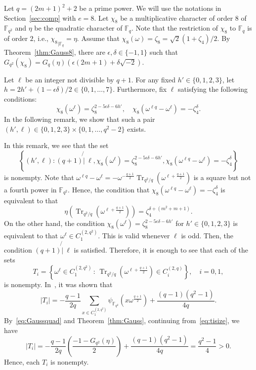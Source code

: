 \documentclass[ALCO,ThmDefs,Unicode]{cedram}
\DeclareMathOperator{\Tr}{Tr}
\newcommand*\F{{\mathbb F}}
\newcommand*{\notmid}{\mathbin{\not{|}\:}}
\begin{document}
Let $q=(2m+1)^2+2$ be a prime power. We will use the notations in Section~\ref{sec:comp} with $e=8$. Let $\chi_8$ be a multiplicative character of order $8$ of $\F_{q^2}$ and $\eta$ be the quadratic character of $\F_{q}$. Note that the restriction of $\chi_8$ to $\F_q$ is of order $2$, i.e., ${\chi_8}_{|\F_q}=\eta$. Assume that $\chi_8(\omega)=\zeta_8=\sqrt{2}(1+\zeta_4)/2$. By Theorem~\ref{thm:Gauss8}, there are $\epsilon,\delta\in \{-1,1\}$ such that $G_{q^2}(\chi_8)=G_q(\eta)(\epsilon (2m+1)+\delta \sqrt{-2})$.

Let $\ell$ be an integer not divisible by $q+1$. For any fixed $h'\in \{0,1,2,3\}$, let $h=2h'+(1-\epsilon \delta)/2\in \{0,1,\ldots,7\}$. Furthermore, fix $\ell$ satisfying the following conditions:
\begin{equation}\label{eq:cond2}
\chi_8(\omega^\ell)=\zeta_8^{2-5\epsilon \delta-6h'},
\quad
\chi_8(\omega^{\ell q}-\omega^\ell)=-\zeta_4^{\delta}.
\end{equation}
In the following remark, we show that such a pair $(h',\ell)\in \{0,1,2,3\}\times \{0,1,\ldots,q^2-2\}$ exists.

\begin{rema}\label{rem:cond2}
In this remark, we see that the set
\[
\left\{(h',\ell):(q+1) \notmid \ell, \chi_8(\omega^\ell)=\zeta_8^{2-5\epsilon \delta-6h'},\chi_8(\omega^{\ell q}-\omega^\ell)=-\zeta_4^{\delta}\right\}
\]
is nonempty. Note that $\omega^{\ell q}-\omega^\ell=-\omega^{-\frac{q+1}{2}}\Tr_{q^2/q}(\omega^{\ell+\frac{q+1}{2}})$ is a square but not a fourth power in $\F_{q^2}$. Hence, the condition that $\chi_8(\omega^{\ell q}-\omega^\ell)=-\zeta_4^{\delta}$ is equivalent to that
\[
\eta(\Tr_{q^2/q}(\omega^{\ell+\frac{q+1}{2}}))=\zeta_4^{\delta+(m^2+m+1)}.
\]
On the other hand, the condition $\chi_8(\omega^\ell)=\zeta_8^{2-5\epsilon \delta-6h'}$ for $h'\in \{0,1,2,3\}$ is equivalent to that $\omega^\ell\in C_1^{(2,q^2)}$. This is valid whenever $\ell$ is odd. Then, the condition $(q+1)\notmid \ell$ is satisfied. Therefore, it is enough to see that each of the sets
\[
T_i=\left\{\omega^\ell\in C_{1}^{(2,q^2)}\,:\,\Tr_{q^2/q}(\omega^{\ell+\frac{q+1}{2}})\in C_i^{(2,q)}\right\}, \quad i=0,1,
\]
is nonempty. In~\cite[Remark~2]{MS}, it was shown that
\begin{equation}\label{eq:tisize}
|T_i|=-\frac{q-1}{2q}\sum_{x\in C_1^{(2,q^2)}}\psi_{\F_{q^2}}(x\omega^{\frac{q+1}{2}})+\frac{(q-1)(q^2-1)}{4q}.
\end{equation}
By~\eqref{eq:Gaussquad} and Theorem~\ref{thm:Gauss}, continuing from~\eqref{eq:tisize}, we have
\[
|T_i|=-\frac{q-1}{2q}\left(\frac{-1-G_{q^2}(\eta)}{2}\right)+\frac{(q-1)(q^2-1)}{4q}=\frac{q^2-1}{4}>0.
\]
Hence, each $T_i$ is nonempty.
\end{rema}
\end{document}
